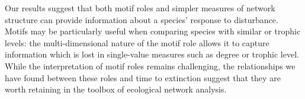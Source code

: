 \documentclass[12pt]{article}
\begin{document}
\begin{spacing}{2.0}
        
        Our results suggest that both motif roles and simpler measures of network structure can provide information about a species' response to disturbance.
        Motifs may be particularly useful when comparing species with similar  or trophic levels: the multi-dimensional nature of the motif role allows it to capture information which is lost in single-value measures such as degree or trophic level.
        While the interpretation of motif roles remains challenging, the relationships we have found between these roles and time to extinction suggest that they are worth retaining in the toolbox of ecological network analysis.
        




     

\clearpage
\end{spacing}
\end{document}
